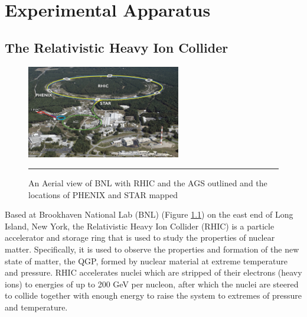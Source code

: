 
\chapter{Experimental Apparatus} %
\label{apparatus}

\section{The Relativistic Heavy Ion Collider}
\begin{figure}[htbp]
  \centering
    \includegraphics[width=0.6\textwidth]{Figures/RHIC-aerial-HR.jpg}
    \rule{35em}{0.5pt}
  \caption[An Aerial view of BNL]{An Aerial view of BNL with RHIC and the AGS outlined and the locations of PHENIX and STAR mapped}
  \label{fig:Aerial RHIC}
\end{figure}
\indent Based at Brookhaven National Lab (BNL) (Figure \ref{fig:Aerial RHIC}) on the east end of Long Island, New York, the Relativistic Heavy Ion Collider (RHIC) is a particle accelerator and storage ring that is used to study the properties of nuclear matter. Specifically, it is used to observe the properties and formation of the new state of matter, the QGP, formed by nuclear material at extreme temperature and pressure. RHIC accelerates nuclei which are stripped of their electrons (heavy ions) to energies of up to 200 GeV per nucleon, after which the nuclei are steered to collide together with enough energy to raise the system to extremes of pressure and temperature.

